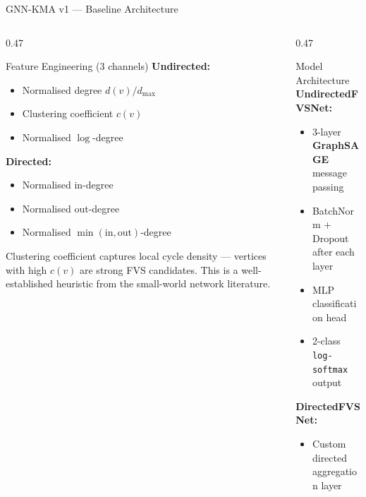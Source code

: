 \documentclass[aspectratio=169,10pt]{beamer}
\renewcommand{\footnotesize}{\tiny}
\begin{document}
\begin{frame}{GNN-KMA v1 — Baseline Architecture}
  \begin{columns}[T]
    \begin{column}{0.47\textwidth}
      \begin{block}{Feature Engineering (3 channels)}
        \textbf{Undirected:}
        \begin{itemize}
          \item Normalised degree $d(v)/d_{\max}$
          \item Clustering coefficient $c(v)$ \cite{watts1998}
          \item Normalised $\log$-degree
        \end{itemize}
        \textbf{Directed:}
        \begin{itemize}
          \item Normalised in-degree
          \item Normalised out-degree
          \item Normalised $\min(\text{in},\text{out})$-degree
        \end{itemize}
      \end{block}
      \vspace{4pt}
      \begin{tcolorbox}[algbox,title=Design Choice]
        \footnotesize
        Clustering coefficient \cite{watts1998} captures local cycle density —
        vertices with high $c(v)$ are strong FVS candidates.
        This is a well-established heuristic from the
        small-world network literature.
      \end{tcolorbox}
    \end{column}
    \begin{column}{0.47\textwidth}
      \begin{block}{Model Architecture}
        \textbf{UndirectedFVSNet:}
        \begin{itemize}
          \item 3-layer \textbf{GraphSAGE} message passing \cite{hamilton2017}
          \item BatchNorm + Dropout after each layer
          \item MLP classification head
          \item 2-class \texttt{log-softmax} output
        \end{itemize}
        \textbf{DirectedFVSNet:}
        \begin{itemize}
          \item Custom directed aggregation layer\\

\end{itemize}
\end{block}
\end{column}
\end{columns}
\end{frame}
\end{document}
